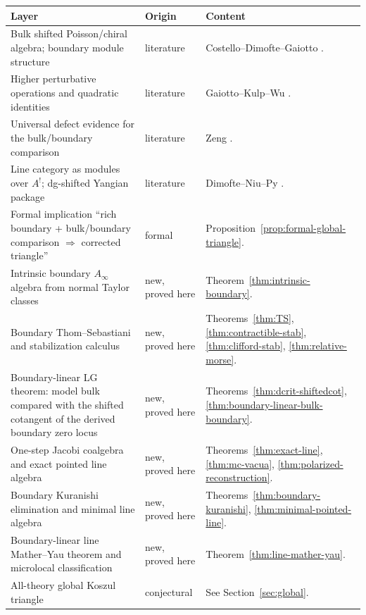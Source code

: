 \begin{center}
\renewcommand{\arraystretch}{1.2}
\begin{longtable}{|p{}|p{}|p{}|}
\hline
\textbf{Layer} & \textbf{Origin} & \textbf{Content} \\
\hline
Bulk shifted Poisson/chiral algebra; boundary module structure & literature & Costello--Dimofte--Gaiotto \cite{CDG20}. \\
\hline
Higher perturbative operations and quadratic identities & literature & Gaiotto--Kulp--Wu \cite{GKW25}. \\
\hline
Universal defect evidence for the bulk/boundary comparison & literature & Zeng \cite{Zeng23}. \\
\hline
Line category as modules over $A^!$; dg-shifted Yangian package & literature & Dimofte--Niu--Py \cite{DNP25}. \\
\hline
Formal implication ``rich boundary + bulk/boundary comparison $\Rightarrow$ corrected triangle'' & formal & Proposition~\ref{prop:formal-global-triangle}. \\
\hline
Intrinsic boundary $A_\infty$ algebra from normal Taylor classes & new, proved here & Theorem~\ref{thm:intrinsic-boundary}. \\
\hline
Boundary Thom--Sebastiani and stabilization calculus & new, proved here & Theorems~\ref{thm:TS}, \ref{thm:contractible-stab}, \ref{thm:clifford-stab}, \ref{thm:relative-morse}. \\
\hline
Boundary-linear LG theorem: model bulk compared with the shifted cotangent of the derived boundary zero locus & new, proved here & Theorems~\ref{thm:dcrit-shiftedcot}, \ref{thm:boundary-linear-bulk-boundary}. \\
\hline
One-step Jacobi coalgebra and exact pointed line algebra & new, proved here & Theorems~\ref{thm:exact-line}, \ref{thm:mc-vacua}, \ref{thm:polarized-reconstruction}. \\
\hline
Boundary Kuranishi elimination and minimal line algebra & new, proved here & Theorems~\ref{thm:boundary-kuranishi}, \ref{thm:minimal-pointed-line}. \\
\hline
Boundary-linear line Mather--Yau theorem and microlocal classification & new, proved here & Theorem~\ref{thm:line-mather-yau}. \\
\hline
All-theory global Koszul triangle & conjectural & See Section~\ref{sec:global}. \\
\hline
\end{longtable}
\end{center}


